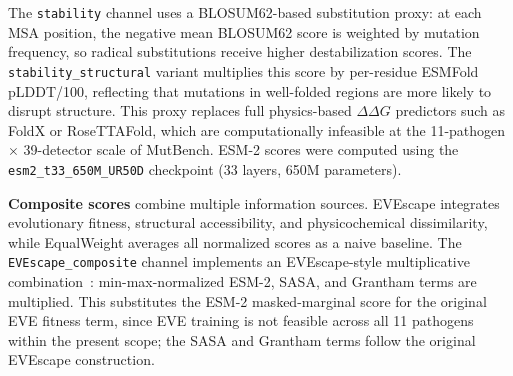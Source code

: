 The \texttt{stability} channel uses a BLOSUM62-based substitution proxy: at each MSA position, the negative mean BLOSUM62 score is weighted by mutation frequency, so radical substitutions receive higher destabilization scores.
The \texttt{stability\_structural} variant multiplies this score by per-residue ESMFold pLDDT/100, reflecting that mutations in well-folded regions are more likely to disrupt structure.
This proxy replaces full physics-based $\Delta\Delta G$ predictors such as FoldX or RoseTTAFold, which are computationally infeasible at the 11-pathogen $\times$ 39-detector scale of MutBench.
ESM-2 scores were computed using the \texttt{esm2\_t33\_650M\_UR50D} checkpoint (33 layers, 650M parameters).

\textbf{Composite scores} combine multiple information sources.
EVEscape integrates evolutionary fitness, structural accessibility, and physicochemical dissimilarity, while EqualWeight averages all normalized scores as a naive baseline.
The \texttt{EVEscape\_composite} channel implements an EVEscape-style multiplicative combination~\cite{thadani2023evescape}: min-max-normalized ESM-2, SASA, and Grantham terms are multiplied.
This substitutes the ESM-2 masked-marginal score for the original EVE fitness term, since EVE training is not feasible across all 11 pathogens within the present scope; the SASA and Grantham terms follow the original EVEscape construction.

